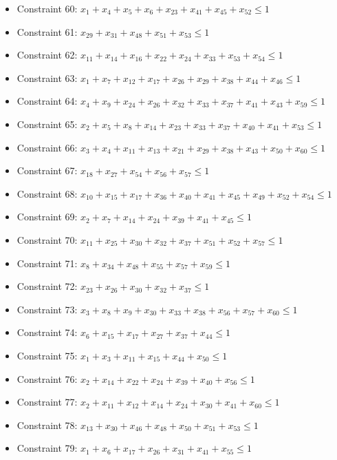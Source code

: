 \documentclass[11pt]{article}
\begin{document}
\begin{itemize}
\item Constraint 60: $x_{1} + x_{4} + x_{5} + x_{6} + x_{23} + x_{41} + x_{45} + x_{52} \le 1$
\item Constraint 61: $x_{29} + x_{31} + x_{48} + x_{51} + x_{53} \le 1$
\item Constraint 62: $x_{11} + x_{14} + x_{16} + x_{22} + x_{24} + x_{33} + x_{53} + x_{54} \le 1$
\item Constraint 63: $x_{1} + x_{7} + x_{12} + x_{17} + x_{26} + x_{29} + x_{38} + x_{44} + x_{46} \le 1$
\item Constraint 64: $x_{4} + x_{9} + x_{24} + x_{26} + x_{32} + x_{33} + x_{37} + x_{41} + x_{43} + x_{59} \le 1$
\item Constraint 65: $x_{2} + x_{5} + x_{8} + x_{14} + x_{23} + x_{33} + x_{37} + x_{40} + x_{41} + x_{53} \le 1$
\item Constraint 66: $x_{3} + x_{4} + x_{11} + x_{13} + x_{21} + x_{29} + x_{38} + x_{43} + x_{50} + x_{60} \le 1$
\item Constraint 67: $x_{18} + x_{27} + x_{54} + x_{56} + x_{57} \le 1$
\item Constraint 68: $x_{10} + x_{15} + x_{17} + x_{36} + x_{40} + x_{41} + x_{45} + x_{49} + x_{52} + x_{54} \le 1$
\item Constraint 69: $x_{2} + x_{7} + x_{14} + x_{24} + x_{39} + x_{41} + x_{45} \le 1$
\item Constraint 70: $x_{11} + x_{25} + x_{30} + x_{32} + x_{37} + x_{51} + x_{52} + x_{57} \le 1$
\item Constraint 71: $x_{8} + x_{34} + x_{48} + x_{55} + x_{57} + x_{59} \le 1$
\item Constraint 72: $x_{23} + x_{26} + x_{30} + x_{32} + x_{37} \le 1$
\item Constraint 73: $x_{3} + x_{8} + x_{9} + x_{30} + x_{33} + x_{38} + x_{56} + x_{57} + x_{60} \le 1$
\item Constraint 74: $x_{6} + x_{15} + x_{17} + x_{27} + x_{37} + x_{44} \le 1$
\item Constraint 75: $x_{1} + x_{3} + x_{11} + x_{15} + x_{44} + x_{50} \le 1$
\item Constraint 76: $x_{2} + x_{14} + x_{22} + x_{24} + x_{39} + x_{40} + x_{56} \le 1$
\item Constraint 77: $x_{2} + x_{11} + x_{12} + x_{14} + x_{24} + x_{30} + x_{41} + x_{60} \le 1$
\item Constraint 78: $x_{13} + x_{30} + x_{46} + x_{48} + x_{50} + x_{51} + x_{53} \le 1$
\item Constraint 79: $x_{1} + x_{6} + x_{17} + x_{26} + x_{31} + x_{41} + x_{55} \le 1$

\end{itemize}
\end{document}
